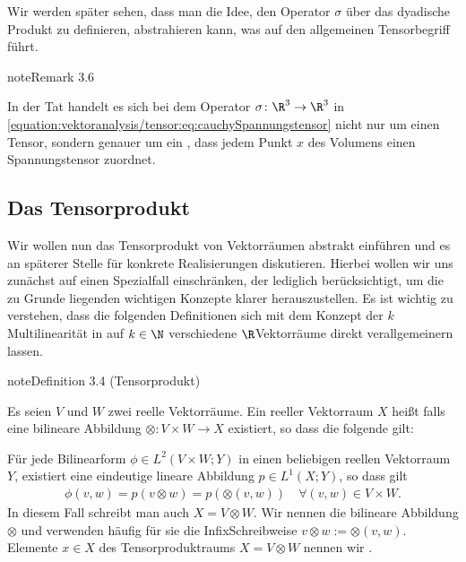 \documentclass[letterpaper,10pt,english]{jupyterBook}
\begin{document}
\sphinxAtStartPar
Wir werden später sehen, dass man die Idee, den Operator \(\sigma\) über das dyadische Produkt zu definieren, abstrahieren kann, was auf den allgemeinen Tensorbegriff führt.
\label{vektoranalysis/tensor:remark-1}
\begin{sphinxadmonition}{note}{Remark 3.6}



\sphinxAtStartPar
In der Tat handelt es sich bei dem Operator \(\sigma \colon \R^3 \rightarrow \R^3\) in \eqref{equation:vektoranalysis/tensor:eq:cauchySpannungstensor} nicht nur um einen Tensor, sondern genauer um ein , dass jedem Punkt \(x\) des Volumens einen Spannungstensor zuordnet.
\end{sphinxadmonition}


\subsection{Das Tensorprodukt}
\label{\detokenize{vektoranalysis/tensor:das-tensorprodukt}}
\sphinxAtStartPar
Wir wollen nun das Tensorprodukt von Vektorräumen abstrakt einführen und es an späterer Stelle für konkrete Realisierungen diskutieren.
Hierbei wollen wir uns zunächst auf einen Spezialfall einschränken, der lediglich  berücksichtigt, um die zu Grunde liegenden wichtigen Konzepte klarer herauszustellen.
Es ist wichtig zu verstehen, dass die folgenden Definitionen sich mit dem Konzept der \(k\)\sphinxhyphen{}Multilinearität in {\hyperref[\detokenize{vektoranalysis/multilinear:s-multilinearformen}]{}} auf \(k \in \N\) verschiedene \(\R\)\sphinxhyphen{}Vektorräume direkt verallgemeinern lassen.
\label{vektoranalysis/tensor:def:tensor}
\begin{sphinxadmonition}{note}{Definition 3.4 (Tensorprodukt)}



\sphinxAtStartPar
Es seien \(V\) und \(W\) zwei reelle Vektorräume.
Ein reeller Vektorraum \(X\) heißt  falls eine bilineare Abbildung \(\otimes:V\times W\rightarrow X\) existiert, so dass die folgende  gilt:

\sphinxAtStartPar
Für jede Bilinearform \(\phi\in L^2(V\times W; Y)\) in einen beliebigen reellen Vektorraum \(Y\), existiert eine eindeutige lineare Abbildung
\(p \in L^1(X; Y)\), so dass gilt
\begin{equation}\label{equation:vektoranalysis/tensor:eq:universell}
\begin{split}\phi(v,w) = p(v\otimes w) = p(\otimes(v,w))\quad\forall (v,w)\in V\times W.\end{split}
\end{equation}
\sphinxAtStartPar
In diesem Fall schreibt man auch \(X = V \otimes W\).
Wir nennen die bilineare Abbildung \(\otimes\)  und verwenden häufig für sie die Infix\sphinxhyphen{}Schreibweise \(v\otimes w := \otimes(v,w)\).
Elemente \(x \in X\) des Tensorproduktraums \(X = V \otimes W\) nennen wir .
\end{sphinxadmonition}
\end{document}
